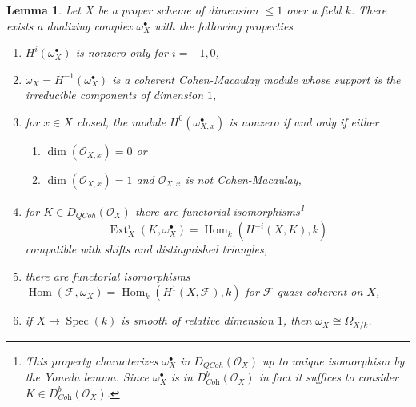 \documentclass{stacks-project}
\theoremstyle{plain}
\newtheorem{lemma}[subsection]{Lemma}
\theoremstyle{definition}
\theoremstyle{remark}
\numberwithin{equation}{subsection}
\def\Spec{\mathop{\mathrm{Spec}}}
\def\Hom{\mathop{\mathrm{Hom}}\nolimits}
\def\Ext{\mathop{\mathrm{Ext}}\nolimits}
\def\QCoh{\mathit{QCoh}}
\begin{document}
\begin{lemma}
\label{lemma-duality-dim-1}
Let $X$ be a proper scheme of dimension $\leq 1$ over a field $k$.
There exists a dualizing complex $\omega_X^\bullet$ with the
following properties
\begin{enumerate}
\item $H^i(\omega_X^\bullet)$ is nonzero only for $i = -1, 0$,
\item $\omega_X = H^{-1}(\omega_X^\bullet)$
is a coherent Cohen-Macaulay module whose support is the
irreducible components of dimension $1$,
\item for $x \in X$ closed, the module $H^0(\omega_{X, x}^\bullet)$
is nonzero if and only if either
\begin{enumerate}
\item $\dim(\mathcal{O}_{X, x}) = 0$ or
\item $\dim(\mathcal{O}_{X, x}) = 1$
and $\mathcal{O}_{X, x}$ is not Cohen-Macaulay,
\end{enumerate}
\item for $K \in D_\QCoh(\mathcal{O}_X)$ there are functorial
isomorphisms\footnote{This property
characterizes $\omega_X^\bullet$ in $D_\QCoh(\mathcal{O}_X)$
up to unique isomorphism by the Yoneda lemma. Since $\omega_X^\bullet$
is in $D^b_{\textit{Coh}}(\mathcal{O}_X)$ in fact it suffices to consider
$K \in D^b_{\textit{Coh}}(\mathcal{O}_X)$.}
$$
\Ext^i_X(K, \omega_X^\bullet) = \Hom_k(H^{-i}(X, K), k)
$$
compatible with shifts and distinguished triangles,
\item there are functorial isomorphisms
$\Hom(\mathcal{F}, \omega_X) = \Hom_k(H^1(X, \mathcal{F}), k)$
for $\mathcal{F}$ quasi-coherent on $X$,
\item if $X \to \Spec(k)$ is smooth of relative dimension $1$,
then $\omega_X \cong \Omega_{X/k}$.
\end{enumerate}
\end{lemma}
\end{document}
